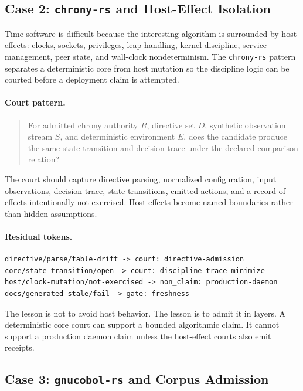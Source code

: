 \documentclass[11pt,a4paper]{article}
\begin{document}
\subsection{Case 2: \texttt{chrony-rs} and Host-Effect Isolation}

Time software is difficult because the interesting algorithm is surrounded by host effects: clocks, sockets, privileges, leap handling, kernel discipline, service management, peer state, and wall-clock nondeterminism. The \texttt{chrony-rs} pattern separates a deterministic core from host mutation so the discipline logic can be courted before a deployment claim is attempted.

\paragraph{Court pattern.}
\begin{quote}
For admitted chrony authority \(R\), directive set \(D\), synthetic observation stream \(S\), and deterministic environment \(E\), does the candidate produce the same state-transition and decision trace under the declared comparison relation?
\end{quote}
The court should capture directive parsing, normalized configuration, input observations, decision trace, state transitions, emitted actions, and a record of effects intentionally not exercised. Host effects become named boundaries rather than hidden assumptions.

\paragraph{Residual tokens.}
\begin{verbatim}
directive/parse/table-drift -> court: directive-admission
core/state-transition/open -> court: discipline-trace-minimize
host/clock-mutation/not-exercised -> non_claim: production-daemon
docs/generated-stale/fail -> gate: freshness
\end{verbatim}
The lesson is not to avoid host behavior. The lesson is to admit it in layers. A deterministic core court can support a bounded algorithmic claim. It cannot support a production daemon claim unless the host-effect courts also emit receipts.

\subsection{Case 3: \texttt{gnucobol-rs} and Corpus Admission}
\end{document}
